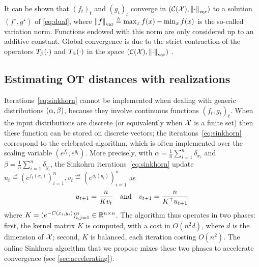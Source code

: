 It can be shown that ${(f_t)}_t$ and ${(g_t)}_t$ converge in $(\mathcal{C}(\mathcal{X}),
\left\| \cdot \right\|_{\text{var}})$ to a solution $(f^\star, g^\star)$ of
\eqref{eq:dual}, where $\left\| f \right\|_{\text{var}} \triangleq \max_x f(x) - \min_x f(x)$
is the so-called variation norm. Functions endowed with this norm are only
considered up to an additive constant.  Global convergence is due to the strict
contraction of the operators $T_{\beta}(\cdot)$ and
$T_{\alpha}(\cdot)$ in the space $(\mathcal{C}(\mathcal{X}), \left\| \cdot \right\|_{\text{var}})$
\citep{lemmens_nonlinear_2012}.

\subsection{Estimating OT distances with realizations}

Iterations~\eqref{eq:sinkhorn} cannot be implemented when dealing with generic distributions $(\alpha,\beta)$, because they involve continuous functions ${(f_t,g_t)}_t$. 
%
When the input distributions are discrete (or equivalently when $\mathcal{X}$ is a finite
set) then these function can be stored on discrete vectors;
the iterations~\eqref{eq:sinkhorn} correspond to the celebrated
\citet{sinkhorn1967concerning} algorithm, which is often implemented over the scaling
variable $(e^{f_t},e^{g_t})$.
%
More precisely, with $\alpha =
\frac{1}{n}\sum_{i=1}^n \delta_{x_i}$ and $\beta = \frac{1}{n} \sum_{i=1}^n
\delta_{y_i}$, the Sinkohrn iterations~\eqref{eq:sinkhorn} update $u_t \eqdef
(e^{f_t(x_i)})_{i=1}^n, v_t \eqdef (e^{g_t(y_i)})_{i=1}^n$ as
\begin{equation*}
	u_{t+1} = \frac{n}{ K v_t }
	\quad \text{and} \quad
	v_{t+1} = \frac{n}{ K^\top u_{t+1} }
\end{equation*}
where $K=(e^{-C(x_i,y_i)})_{i,j=1}^n \in \mathbb{R}^{n \times n}$. The algorithm thus
operates in two phases: first, the kernel matrix $K$ is computed, with a cost in
$O(n^2 d)$, where $d$ is the dimension of $\mathcal{X}$; second, $K$ is balanced, each
iteration costing $O(n^2)$. The online Sinkhorn algorithm that we propose mixes
these two phases to accelerate convergence (see \autoref{sec:accelerating}).


